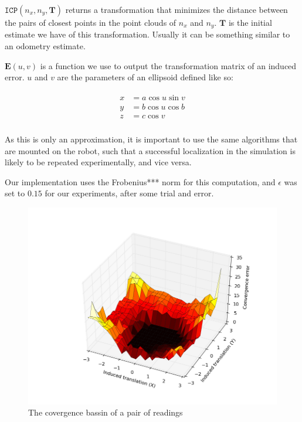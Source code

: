 \documentclass[letterpaper,10 pt,conference]{ieeeconf}
\newcommand{\mat}[1]{\mathbf{#1}}
\begin{document}
$\texttt{ICP}(n_x, n_y, \mat{T})$ returns a transformation that minimizes the
distance between the pairs of closest points in the point clouds of $n_x$ and
$n_y$. $\mat{T}$ is the initial estimate we have of this transformation. Usually
it can be something similar to an odometry estimate.

$\mat{E}(u,v)$ is a function we use to output the transformation matrix of an
induced error. $u$ and $v$ are the parameters of an ellipsoid defined like so:

\begin{align}
  \begin{split}
x &= a \cos u \sin v \\
y &= b \cos u \cos b \\
z &= c \cos v \\
\end{split}
\end{align}

As this is only an approximation, it is important to use the same algorithms
that are mounted on the robot, such that a successful localization in the
simulation is likely to be repeated experimentally, and vice versa.

Our implementation uses the Frobenius*** norm for this computation, and $\epsilon$
was set to $0.15$ for our experiments, after some trial and error.

\begin{figure}[thpb]
  \centering
  \includegraphics[scale=0.4]{convergence_bassin}
  \caption{The covergence bassin of a pair of readings}
  \label{convergence_bassin}
\end{figure}
\end{document}
